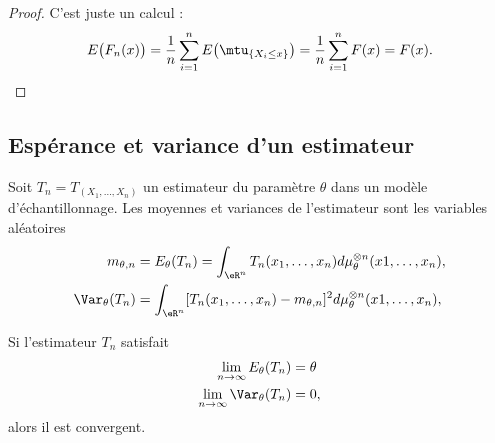 \begin{proof}
    C'est juste un calcul :
    \begin{equation}
        E\big( F_n(x) \big)=\frac{1}{ n }\sum_{i=1}^nE\big( \mtu_{\{ X_i\leq x \}} \big)=\frac{1}{n }\sum_{i=1}^nF(x)=F(x).
    \end{equation}
\end{proof}


\subsection{Espérance et variance d'un estimateur}

Soit \( T_n=T_(X_1,\ldots,X_n)\) un estimateur du paramètre \( \theta\) dans un modèle d'échantillonnage. Les moyennes et variances de l'estimateur sont les variables aléatoires
\begin{subequations}
    \begin{align}
        m_{\theta,n}&=E_{\theta}(T_n)=\int_{\eR^n}T_n(x_1,\ldots,x_n)d\mu_{\theta}^{\otimes n}(x1,\ldots,x_n),\\
        \Var_{\theta}(T_n)&=\int_{\eR^n}[T_n(x_1,\ldots,x_n)-m_{\theta,n}]^2d\mu_{\theta}^{\otimes n}(x1,\ldots,x_n),
    \end{align}
\end{subequations}

\begin{lemma}
    Si l'estimateur \( T_n\) satisfait
    \begin{subequations}
        \begin{align}
            \lim_{n\to \infty} E_{\theta}(T_n)&=\theta\\
            \lim_{n\to \infty} \Var_{\theta}(T_n)&=0,
        \end{align}
    \end{subequations}
    alors il est convergent.
\end{lemma}

